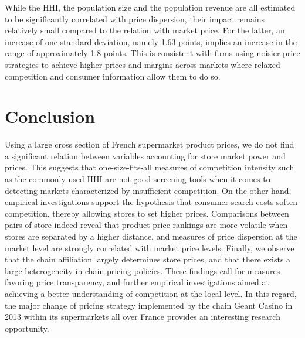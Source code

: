 \documentclass[english]{article}
\begin{document}
While the HHI, the population size and the population revenue are all estimated to be significantly correlated with price dispersion, their impact remains relatively small compared to the relation with market price. For the latter, an increase of one standard deviation, namely 1.63 points, implies an increase in the range of approximately 1.8 points. This is consistent with firms using noisier price strategies to achieve higher prices and margins across markets where relaxed competition and consumer information allow them to do so.

\section{Conclusion}

Using a large cross section of French supermarket product prices, we do not find a significant relation between variables accounting for store market power and prices. This suggests that one-size-fits-all measures of competition intensity such as the commonly used HHI are not good screening tools when it comes to detecting markets characterized by insufficient competition. On the other hand, empirical investigations support the hypothesis that consumer search costs soften competition, thereby allowing stores to set higher prices. Comparisons between pairs of store indeed reveal that product price rankings are more volatile when stores are separated by a higher distance, and measures of price dispersion at the market level are strongly correlated with market price levels. Finally, we observe that the chain affiliation largely determines store prices, and that there exists a large heterogeneity in chain pricing policies.
These findings call for measures favoring price transparency, and further empirical investigations aimed at achieving a better understanding of competition at the local level. In this regard, the major change of pricing strategy implemented by the chain Geant Casino in 2013 within its supermarkets all over France provides an interesting research opportunity.


\newpage



\newpage


\end{document}
